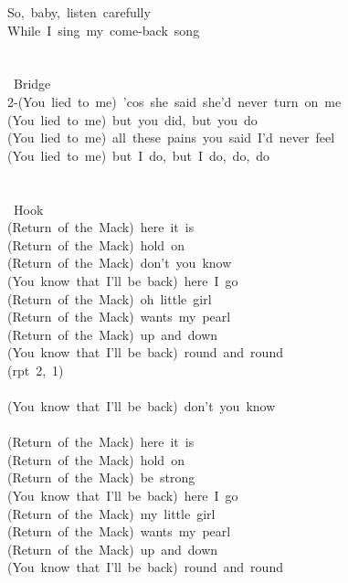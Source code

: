 {So,\ baby,\ listen\ carefully\\
While\ I\ sing\ my\ come-back\ song\\
\\
\\
\lbrack\ Bridge\rbrack\\
2-(You\ lied\ to\ me)\ 'cos\ she\ said\ she'd\ never\ turn\ on\ me\\
(You\ lied\ to\ me)\ but\ you\ did,\ but\ you\ do\\
(You\ lied\ to\ me)\ all\ these\ pains\ you\ said\ I'd\ never\ feel\\
(You\ lied\ to\ me)\ but\ I\ do,\ but\ I\ do,\ do,\ do\\
\\
\\
\lbrack\ Hook\rbrack\\
(Return\ of\ the\ Mack)\ here\ it\ is\\
(Return\ of\ the\ Mack)\ hold\ on\\
(Return\ of\ the\ Mack)\ don't\ you\ know\\
(You\ know\ that\ I'll\ be\ back)\ here\ I\ go\\
(Return\ of\ the\ Mack)\ oh\ little\ girl\\
(Return\ of\ the\ Mack)\ wants\ my\ pearl\\
(Return\ of\ the\ Mack)\ up\ and\ down\\
(You\ know\ that\ I'll\ be\ back)\ round\ and\ round\\
(rpt\ 2,\ 1)\\
\\
(You\ know\ that\ I'll\ be\ back)\ don't\ you\ know\\
\\
(Return\ of\ the\ Mack)\ here\ it\ is\\
(Return\ of\ the\ Mack)\ hold\ on\\
(Return\ of\ the\ Mack)\ be\ strong\\
(You\ know\ that\ I'll\ be\ back)\ here\ I\ go\\
(Return\ of\ the\ Mack)\ my\ little\ girl\\
(Return\ of\ the\ Mack)\ wants\ my\ pearl\\
(Return\ of\ the\ Mack)\ up\ and\ down\\
(You\ know\ that\ I'll\ be\ back)\ round\ and\ round\ }
